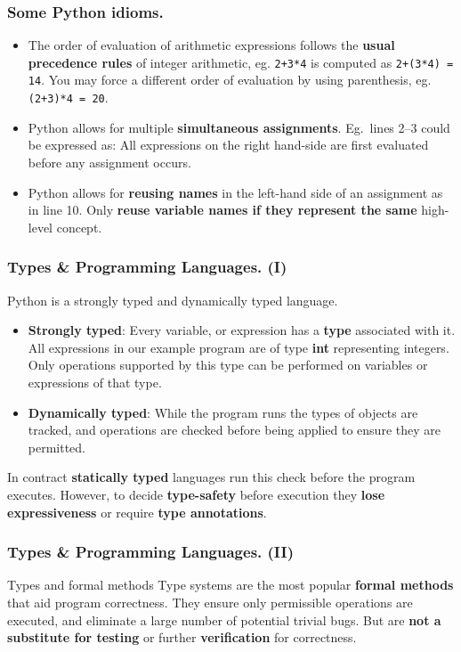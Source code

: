 \documentclass{beamer} %
\newcommand\emc[1]{\textcolor{midred}{\textbf{#1}}}
\begin{document}
\begin{frame}
\frametitle{Some Python idioms.}

\begin{itemize}
	\item The order of evaluation of arithmetic expressions follows the \emc{usual precedence rules} of integer arithmetic, eg. \texttt{2+3*4} is computed as \texttt{2+(3*4) = 14}. You may force a different order of evaluation by using parenthesis, eg. \texttt{(2+3)*4 = 20}.
	\item Python allows for multiple \emc{simultaneous assignments}. Eg.\ lines 2--3 could be expressed as:
	All expressions on the right hand-side are first evaluated before any assignment occurs.
	\item Python allows for \emc{reusing names} in the left-hand side of an assignment as in line 10.
	Only \emc{reuse variable names if they represent the same} high-level concept.

\end{itemize}

\end{frame}

\begin{frame}
\frametitle{Types \& Programming Languages. (I)}

Python is a strongly typed and dynamically typed language. 
\begin{itemize}
\item \emc{Strongly typed}: Every variable, or expression has a \emc{type} associated with it. All expressions in our example program are of type \emc{int} representing integers. Only operations supported by this type can be performed on variables or expressions of that type.
\item \emc{Dynamically typed}: While the program runs the types of objects are tracked, and operations are checked before being applied to ensure they are permitted. 
\end{itemize}

\vspace{5mm}
In contract \emc{statically typed} languages run this check before the program executes. However, to decide \emc{type-safety} before execution they \emc{lose expressiveness} or require \emc{type annotations}.

\end{frame}

\begin{frame}
\frametitle{Types \& Programming Languages. (II)}

\begin{block}{Types and formal methods}
Type systems are the most popular \emc{formal methods} that aid program correctness. They ensure only permissible operations are executed, and eliminate a large number of potential trivial bugs. But are \emc{not a substitute for testing} or further \emc{verification} for correctness.
\end{block}

\end{frame}
\end{document}
